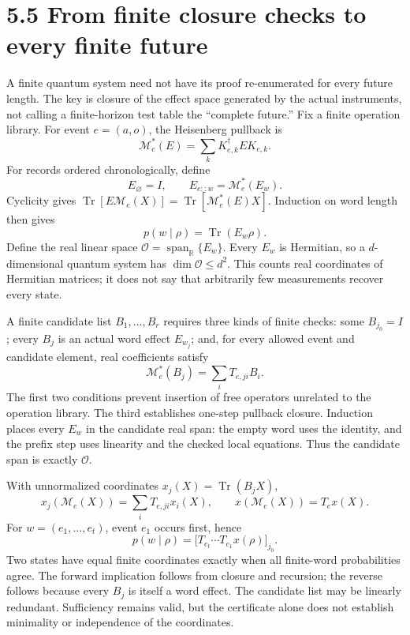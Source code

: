 \documentclass[
  11pt,
  oneside]{book}
\begin{document}
\section{5.5 From finite closure checks to every finite future}

A finite quantum system need not have its proof re-enumerated for every
future length. The key is closure of the effect space generated by the
actual instruments, not calling a finite-horizon test table the
``complete future.'' Fix a finite operation library. For event
\(e=(a,o)\), the Heisenberg pullback is \[
\mathcal M_e^*(E)=\sum_kK_{e,k}^\dagger E K_{e,k}.
\] For records ordered chronologically, define \[
E_{\varnothing}=I,\qquad E_{e::w}=\mathcal M_e^*(E_w).
\] Cyclicity gives
\(\operatorname{Tr}[E\mathcal M_e(X)]=\operatorname{Tr}[\mathcal M_e^*(E)X]\).
Induction on word length then gives \[
p(w\mid\rho)=\operatorname{Tr}(E_w\rho).
\] Define the real linear space
\(\mathcal O=\operatorname{span}_{\mathbb R}\{E_w\}\). Every \(E_w\) is
Hermitian, so a \(d\)-dimensional quantum system has
\(\dim\mathcal O\le d^2\). This counts real coordinates of Hermitian
matrices; it does not say that arbitrarily few measurements recover
every state.

A finite candidate list \(B_1,\ldots,B_r\) requires three kinds of
finite checks: some \(B_{j_0}=I\); every \(B_j\) is an actual word
effect \(E_{w_j}\); and, for every allowed event and candidate element,
real coefficients satisfy \[
\mathcal M_e^*(B_j)=\sum_iT_{e,ji}B_i.
\] The first two conditions prevent insertion of free operators
unrelated to the operation library. The third establishes one-step
pullback closure. Induction places every \(E_w\) in the candidate real
span: the empty word uses the identity, and the prefix step uses
linearity and the checked local equations. Thus the candidate span is
exactly \(\mathcal O\).

With unnormalized coordinates \(x_j(X)=\operatorname{Tr}(B_jX)\), \[
x_j(\mathcal M_e(X))=\sum_iT_{e,ji}x_i(X),\qquad
x(\mathcal M_e(X))=T_ex(X).
\] For \(w=(e_1,\ldots,e_t)\), event \(e_1\) occurs first, hence \[
p(w\mid\rho)=\bigl[T_{e_t}\cdots T_{e_1}x(\rho)\bigr]_{j_0}.
\] Two states have equal finite coordinates exactly when all finite-word
probabilities agree. The forward implication follows from closure and
recursion; the reverse follows because every \(B_j\) is itself a word
effect. The candidate list may be linearly redundant. Sufficiency
remains valid, but the certificate alone does not establish minimality
or independence of the coordinates.
\end{document}
